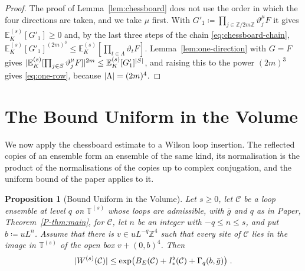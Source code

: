 \documentclass[11pt]{preprint}
\DeclarePairedDelimiter{\abs}{\lvert}{\rvert}
\numberwithin{equation}{section}
\newtheorem{proposition}[theorem]{Proposition}
\theoremstyle{definition}
\theoremstyle{remark}
\theoremstyle{plain}
\begin{document}
\begin{proof}
The proof of Lemma~\ref{lem:chessboard} does not use the order in which the four directions are taken, and we take $\mu$ first. With $G'_1 \coloneqq \prod_{j \in \mathbb Z/2m\mathbb Z}\vartheta^\mu_jF$ it gives $\mathbb E^{(s)}_K[G'_1] \geq 0$ and, by the last three steps of the chain \eqref{eq:chessboard-chain}, $\mathbb E^{(s)}_K[G'_1]^{(2m)^3} \leq \mathbb E^{(s)}_K[\prod_{t \in \Lambda}\vartheta_tF]$. Lemma~\ref{lem:one-direction} with $G = F$ gives $\abs{\mathbb E^{(s)}_K[\prod_{j \in S}\vartheta^\mu_jF]}^{2m} \leq \mathbb E^{(s)}_K[G'_1]^{\abs{S}}$, and raising this to the power $(2m)^3$ gives \eqref{eq:one-row}, because $\abs{\Lambda} = (2m)^4$.
\end{proof}

\section{The Bound Uniform in the Volume}\label{sec:volume-bound}

We now apply the chessboard estimate to a Wilson loop insertion. The reflected copies of an ensemble form an ensemble of the same kind, its normalisation is the product of the normalisations of the copies up to complex conjugation, and the uniform bound of the paper applies to it.

\begin{proposition}[Bound Uniform in the Volume]\label{prop:volume-bound}
Let $s \geq 0$, let $\mathcal C$ be a loop ensemble at level $q$ on $\mathbb T^{(s)}$ whose loops are admissible, with $\bar g$ and $q$ as in Paper, Theorem~\ref{P-thm:main}, for $\mathcal C$, let $n$ be an integer with $-q \leq n \leq s$, and put $b \coloneqq uL^n$. Assume that there is $v \in uL^{-q}\mathbb Z^4$ such that every site of $\mathcal C$ lies in the image in $\mathbb T^{(s)}$ of the open box $v + (0, b)^4$. Then
\begin{equation}\label{eq:volume-bound}
    \abs{W^{(s)}(\mathcal C)} \leq \exp\bigl(B_E(\mathcal C) + I^\flat_*(\mathcal C) + \Gamma_q(b, \bar g)\bigr)\;.
\end{equation}
\end{proposition}
\end{document}
